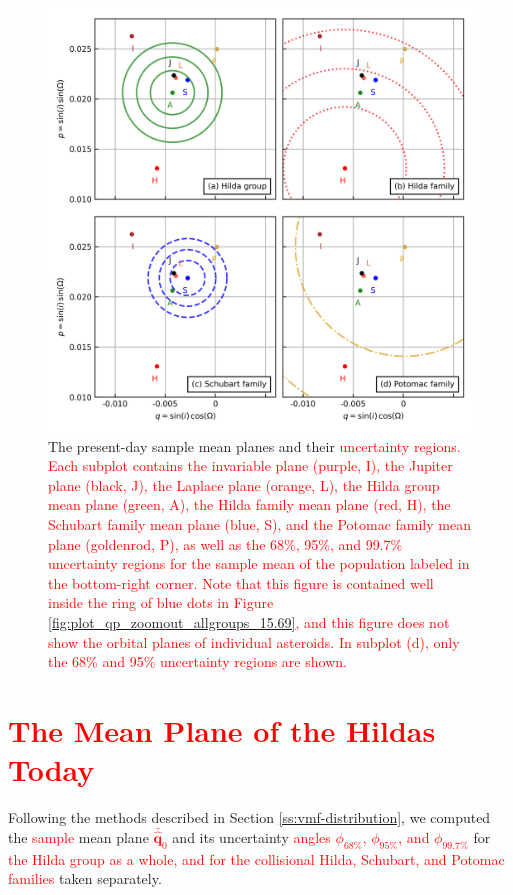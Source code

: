\documentclass[a4paper,fleqn]{cas-sc}
\begin{document}
\begin{linenumbers}
\begin{centering}
\begin{figure}
\includegraphics[width=0.8\columnwidth]{figure3.png}
\caption{
The present-day sample mean planes and their \textcolor{red}{uncertainty regions.
Each subplot contains the invariable plane (purple, I), the Jupiter plane (black, J), the Laplace plane (orange, L), the Hilda group mean plane (green, A), the Hilda family mean plane (red, H), the Schubart family mean plane (blue, S), and the Potomac family mean plane (goldenrod, P), as well as the 68\%, 95\%, and 99.7\% uncertainty regions for the sample mean of the population labeled in the bottom-right corner.
Note that this figure is contained well inside the ring of blue dots in Figure \ref{fig:plot_qp_zoomout_allgroups_15.69}, and this figure does not show the orbital planes of individual asteroids.
In subplot (d), only the 68\% and 95\% uncertainty regions are shown.
}
}
\label{fig:mean_pole_confidence_overlaps_15.69}
\end{figure}
\end{centering}

\section{\textcolor{red}{The Mean Plane of the Hildas Today}}
\label{s:hildas-xcc-today}

Following the methods described in Section \ref{ss:vmf-distribution}, we computed the \textcolor{red}{sample} mean plane \textcolor{red}{$\bar{\hat{\mathbf{q}}}_0$} and its uncertainty \textcolor{red}{angles $\phi_{68\%}$, $\phi_{95\%}$, and $\phi_{99.7\%}$} for 
\textcolor{red}{the Hilda group as a whole, and for the collisional Hilda, Schubart, and Potomac families} taken separately.


\end{linenumbers}
\end{document}
